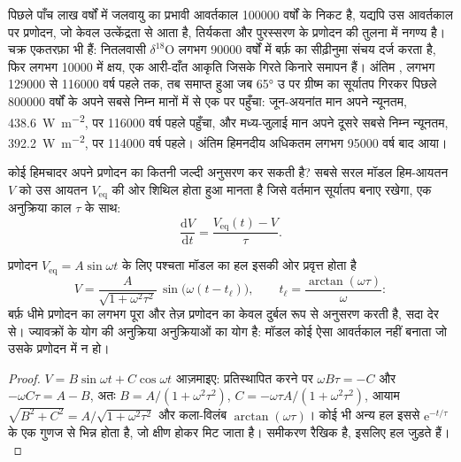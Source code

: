 पिछले पाँच लाख वर्षों में जलवायु का प्रभावी आवर्तकाल \num{100000} वर्षों के निकट है,
यद्यपि उस आवर्तकाल पर प्रणोदन, जो केवल उत्केंद्रता से आता है, तिर्यकता और पुरस्सरण के प्रणोदन
की तुलना में नगण्य है। चक्र एकतरफ़ा भी हैं: नितलवासी $\delta^{18}$O
लगभग \num{90000} वर्षों में बर्फ़ का सीढ़ीनुमा संचय दर्ज करता है, फिर लगभग
\num{10000} में क्षय, एक आरी-दाँत आकृति जिसके गिरते किनारे समापन हैं। अंतिम , लगभग
\num{129000} से \num{116000} वर्ष पहले तक, तब समाप्त हुआ जब \ang{65} उ पर ग्रीष्म का सूर्यातप गिरकर
पिछले \num{800000} वर्षों के अपने सबसे निम्न मानों में से एक पर पहुँचा: जून-अयनांत मान अपने
न्यूनतम, \qty{438.6}{W.m^{-2}}, पर \num{116000} वर्ष पहले पहुँचा, और मध्य-जुलाई मान अपने दूसरे सबसे निम्न
न्यूनतम, \qty{392.2}{W.m^{-2}}, पर \num{114000} वर्ष पहले। अंतिम हिमनदीय अधिकतम लगभग
\num{95000} वर्ष बाद आया।

कोई हिमचादर अपने प्रणोदन का कितनी जल्दी अनुसरण कर सकती है? सबसे सरल मॉडल हिम-आयतन $V$ को
उस आयतन $V_{\mathrm{eq}}$ की ओर शिथिल होता हुआ मानता है जिसे वर्तमान सूर्यातप बनाए रखेगा, एक
अनुक्रिया काल $\tau$ के साथ:
\[
  \frac{\mathrm dV}{\mathrm dt} = \frac{V_{\mathrm{eq}}(t) - V}{\tau} .
\]

\begin{proposition}[एक पश्चित अनुक्रिया]\label{prop:b2:orbital-forcing:lag}
प्रणोदन $V_{\mathrm{eq}} = A\sin\omega t$ के लिए पश्चता मॉडल का हल इसकी ओर प्रवृत्त होता है
\[
  V = \frac{A}{\sqrt{1 + \omega^2\tau^2}}\,\sin\bigl(\omega(t - t_{\ell})\bigr),\qquad
  t_{\ell} = \frac{\arctan(\omega\tau)}{\omega} :
\]
बर्फ़ धीमे प्रणोदन का लगभग पूरा और तेज़ प्रणोदन का केवल दुर्बल रूप से अनुसरण करती है, सदा देर से। ज्यावक्रों के
योग की अनुक्रिया अनुक्रियाओं का योग है: मॉडल कोई ऐसा आवर्तकाल नहीं बनाता जो उसके प्रणोदन में
न हो।
\end{proposition}

\begin{proof}
$V = B\sin\omega t + C\cos\omega t$ आज़माइए: प्रतिस्थापित करने पर $\omega B\tau = -C$ और $-\omega C\tau = A -
B$, अतः $B = A/(1 + \omega^2\tau^2)$, $C = -\omega\tau A/(1 + \omega^2\tau^2)$, आयाम
$\sqrt{B^2 + C^2} = A/\sqrt{1 + \omega^2\tau^2}$ और कला-विलंब $\arctan(\omega\tau)$। कोई भी अन्य
हल इससे $\mathrm e^{-t/\tau}$ के एक गुणज से भिन्न होता है, जो क्षीण होकर मिट जाता है।
समीकरण रैखिक है, इसलिए हल जुड़ते हैं।
\end{proof}

